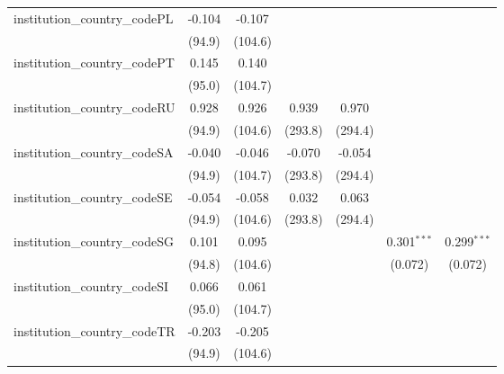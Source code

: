 \begin{tabular}{lcccccc}
   institution\_country\_codePL          & -0.104        & -0.107        &               &               &               &   \\   
                                         & (94.9)        & (104.6)       &               &               &               &   \\   
   institution\_country\_codePT          & 0.145         & 0.140         &               &               &               &   \\   
                                         & (95.0)        & (104.7)       &               &               &               &   \\   
   institution\_country\_codeRU          & 0.928         & 0.926         & 0.939         & 0.970         &               &   \\   
                                         & (94.9)        & (104.6)       & (293.8)       & (294.4)       &               &   \\   
   institution\_country\_codeSA          & -0.040        & -0.046        & -0.070        & -0.054        &               &   \\   
                                         & (94.9)        & (104.7)       & (293.8)       & (294.4)       &               &   \\   
   institution\_country\_codeSE          & -0.054        & -0.058        & 0.032         & 0.063         &               &   \\   
                                         & (94.9)        & (104.6)       & (293.8)       & (294.4)       &               &   \\   
   institution\_country\_codeSG          & 0.101         & 0.095         &               &               & 0.301$^{***}$ & 0.299$^{***}$\\   
                                         & (94.8)        & (104.6)       &               &               & (0.072)       & (0.072)\\   
   institution\_country\_codeSI          & 0.066         & 0.061         &               &               &               &   \\   
                                         & (95.0)        & (104.7)       &               &               &               &   \\   
   institution\_country\_codeTR          & -0.203        & -0.205        &               &               &               &   \\   
                                         & (94.9)        & (104.6)       &               &               &               &   \\   

\end{tabular}
